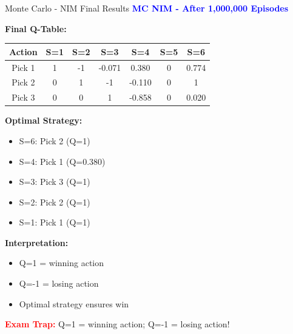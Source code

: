 \documentclass[8pt]{beamer}
\begin{document}
\begin{frame}{Monte Carlo - NIM Final Results}
\fontsize{6.5}{7.5}\selectfont
\textcolor{blue}{\textbf{MC NIM - After 1,000,000 Episodes}}

\textbf{Final Q-Table:}
\begin{tabular}{|c|c|c|c|c|c|c|}
\hline
Action & S=1 & S=2 & S=3 & S=4 & S=5 & S=6 \\
\hline
Pick 1 & 1 & -1 & -0.071 & 0.380 & 0 & 0.774 \\
\hline
Pick 2 & 0 & 1 & -1 & -0.110 & 0 & 1 \\
\hline
Pick 3 & 0 & 0 & 1 & -0.858 & 0 & 0.020 \\
\hline
\end{tabular}

\textbf{Optimal Strategy:}
\begin{itemize}
\item S=6: Pick 2 (Q=1)
\item S=4: Pick 1 (Q=0.380)
\item S=3: Pick 3 (Q=1)
\item S=2: Pick 2 (Q=1)
\item S=1: Pick 1 (Q=1)
\end{itemize}

\textbf{Interpretation:}
\begin{itemize}
\item Q=1 = winning action
\item Q=-1 = losing action
\item Optimal strategy ensures win
\end{itemize}

\textcolor{red}{\textbf{Exam Trap:}} Q=1 = winning action; Q=-1 = losing action!
\end{frame}
\end{document}
